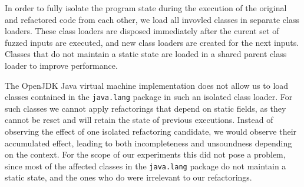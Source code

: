 \documentclass[sigconf,review,anonymous]{acmart}
\begin{document}
In order to fully isolate the program state during the execution of the original
and refactored code from each other, we load all invovled classes in separate
class loaders. These class loaders are disposed immediately after the curent set
of fuzzed inputs are executed, and new class loaders are created for the next
inputs. Classes that do not maintain a static state are loaded in a shared
parent class loader to improve performance.

The OpenJDK Java virtual machine implementation does not allow us to load
classes contained in the \texttt{java.lang} package in such an isolated class
loader. For such classes we cannot apply refactorings that depend on static
fields, as they cannot be reset and will retain the state of previous
executions. Instead of observing the effect of one isolated refactoring
candidate, we would observe their accumulated effect, leading to both
incompleteness and unsoundness depending on the context. For the scope of our
experiments this did not pose a problem, since most of the affected classes in
the \texttt{java.lang} package do not maintain a static state, and the ones who do
were irrelevant to our refactorings.





\end{document}
